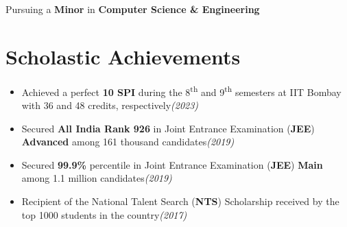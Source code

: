 \documentclass[10pt, a4paper]{article}
\newcommand{\rhsmall}[1]{\hfill{\footnotesize{\textsl{(#1)}}}}
\begin{document}
\thispagestyle{firstpage}
Pursuing a \textbf{Minor} in \textbf{Computer Science \& Engineering}
\section{Scholastic Achievements}
\begin{itemize}
	\item Achieved a perfect \textbf{10 SPI} during the 8\textsuperscript{th} and 9\textsuperscript{th} semesters at IIT Bombay with 36 and 48 credits, respectively\rhsmall{2023}%
	\item Secured \textbf{All India Rank 926} in Joint Entrance Examination (\textbf{JEE}) \textbf{Advanced} among 161 thousand candidates\rhsmall{2019}
	\item Secured \textbf{99.9\%} percentile in Joint Entrance Examination (\textbf{JEE}) \textbf{Main} among 1.1 million candidates\rhsmall{2019}
	\item Recipient of the National Talent Search (\textbf{NTS}) Scholarship received by the top 1000 students in the country\rhsmall{2017}
\end{itemize}
\end{document}
